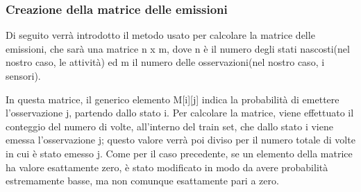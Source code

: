 \documentclass[10pt,a4paper]{article}
\begin{document}
\subsubsection{Creazione della matrice delle emissioni}
Di seguito verrà introdotto il metodo usato per calcolare la matrice delle emissioni, che sarà una matrice  n x m, dove n è il numero degli stati nascosti(nel nostro caso, le attività) ed m il numero delle osservazioni(nel nostro caso, i sensori).

In questa matrice, il generico elemento M[i][j] indica la probabilità di emettere l'osservazione j, partendo dallo stato i. Per calcolare la matrice, viene effettuato il conteggio del numero di volte, all'interno del train set, che dallo stato i viene emessa l'osservazione j; questo valore verrà poi diviso per il numero totale di volte in cui è stato emesso j. Come per il caso precedente, se un elemento della matrice ha valore esattamente zero, è stato modificato in modo da avere probabilità estremamente basse, ma non comunque esattamente pari a zero.
\end{document}

